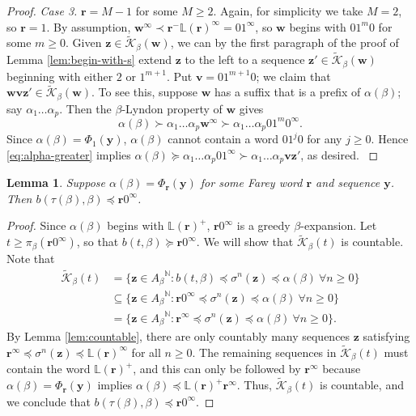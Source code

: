 \documentclass[11pt]{amsart}
\newtheorem{lemma}[theorem]{Lemma}
\theoremstyle{definition}
\theoremstyle{remark}
\numberwithin{equation}{section}
\newcommand{\N}{\ensuremath{\mathbb{N}}}
\renewcommand{\L}{\ensuremath{\mathbb{L}}}
\newcommand{\Kt}{\widetilde{\mathcal{K}}}
\renewcommand{\r}{ {\mathbf{r}}}
\renewcommand{\v}{\mathbf{v}}
\newcommand{\w}{\mathbf{w}}
\newcommand{\y}{\mathbf{y}}
\newcommand{\z}{\mathbf{z}}
\newcommand{\f}{\infty}
\newcommand{\al}{\alpha}
\newcommand{\lle}{\preccurlyeq}
\newcommand{\lge}{\succcurlyeq}
\newcommand{\si}{\sigma}
\begin{document}
\begin{proof}
{\medskip
{\em Case 3.} $\r=M-1$ for some $M\geq 2$. Again, for simplicity we take $M=2$, so $\r=1$. By assumption, 
$\w^\f\prec \r^-\L(\r)^\f=01^\f$, so $\w$ begins with $01^m0$ for some $m\geq 0$. Given $\z\in\Kt_\beta(\w)$, we can by the first paragraph of the proof of Lemma \ref{lem:begin-with-s} extend $\z$ to the left to a sequence $\z'\in\Kt_\beta(\w)$ beginning with either $2$ or $1^{m+1}$. Put $\v=01^{m+1}0$; we claim that $\w\v\z'\in\Kt_\beta(\w)$. To see this, suppose $\w$ has a suffix that is a prefix of $\al(\beta)$; say $\al_1\dots\al_p$. Then the $\beta$-Lyndon property of $\w$ gives
\begin{equation} \label{eq:alpha-greater}
\al(\beta)\succ\al_1\dots\al_p\w^\f\succ \al_1\dots\al_p 01^m0^\f.
\end{equation}
Since $\al(\beta)=\Phi_1(\y)$, $\al(\beta)$ cannot contain a word $01^j0$ for any $j\geq 0$. Hence \eqref{eq:alpha-greater} implies $\al(\beta)\lge \al_1\dots\al_p 01^\f\succ \al_1\dots\al_p \v\z'$, as desired.
}
\end{proof}

\begin{lemma} \label{lem:renormalizable-inequality}
Suppose $\al(\beta)=\Phi_\r(\y)$ for some Farey word $\r$ and sequence $\y$. Then $b(\tau(\beta),\beta)\lle \r0^\f$.
\end{lemma}

\begin{proof}
Since $\al(\beta)$ begins with $\L(\r)^+$, $\r0^\f$ is a greedy $\beta$-expansion. Let $t\geq \pi_\beta(\r0^\f)$, so that $b(t,\beta)\lge \r0^\f$. We will show that $\Kt_\beta(t)$ is countable. Note that
\begin{align*}
\Kt_\beta(t)&=\{\z\in{A_\beta}^\N: b(t,\beta)\lle \si^n(\z)\lle \al(\beta)\ \forall n\geq 0\}\\
&\subseteq \{\z\in{A_\beta}^\N: \r0^\f\lle \si^n(\z)\lle \al(\beta)\ \forall n\geq 0\}\\
&=\{\z\in{A_\beta}^\N: \r^\f\lle \si^n(\z)\lle \al(\beta)\ \forall n\geq 0\}.
\end{align*}
By Lemma \ref{lem:countable}, there are only countably many sequences $\z$ satisfying $\r^\f\lle \si^n(\z)\lle \L(\r)^\f$ for all $n\geq 0$. The remaining sequences in $\Kt_\beta(t)$ must contain the word $\L(\r)^+$, and this can only be followed by $\r^\f$ because $\al(\beta)=\Phi_\r(\y)$ implies $\al(\beta)\lle\L(\r)^+\r^\f$. Thus, $\Kt_\beta(t)$ is countable, and we conclude that $b(\tau(\beta),\beta)\lle \r0^\f$.
\end{proof}
\end{document}
